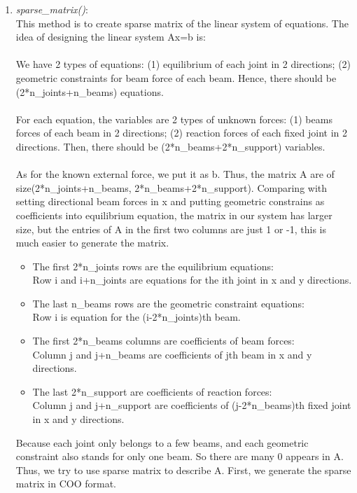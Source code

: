 \documentclass{article}
\begin{document}
\begin{enumerate}
\item \emph{sparse\_matrix()}:\\
This method is to create sparse matrix of the linear system of equations. The idea of designing the linear system Ax=b is: \\\\
We have 2 types of equations: (1) equilibrium of each joint in 2 directions; (2) geometric constraints for beam force of each beam. Hence, there should be (2*n\_joints+n\_beams) equations. \\\\
For each equation, the variables are 2 types of unknown forces: (1) beams forces of each beam in 2 directions; (2) reaction forces of each fixed joint in 2 directions. Then, there should be (2*n\_beams+2*n\_support) variables. \\\\
As for the known external force, we put it as b. Thus, the matrix A are of size(2*n\_joints+n\_beams, 2*n\_beams+2*n\_support). Comparing with setting directional beam forces in x and putting geometric constrains as coefficients into equilibrium equation, the matrix in our system has larger size, but the entries of A in the first two columns are just 1 or -1, this is much easier to generate the matrix.
\begin{itemize}
\item  The first 2*n\_joints rows are the equilibrium equations:\\
Row i and i+n\_joints are equations for the ith joint in x and y directions.
\item The last n\_beams rows are the geometric constraint equations:\\
Row i is equation for the (i-2*n\_joints)th beam.
\item The first 2*n\_beams columns are coefficients of beam forces:\\
Column j and j+n\_beams are coefficients of jth beam in x and y directions.
\item The last 2*n\_support are coefficients of reaction forces:\\
Column j and j+n\_support are coefficients of (j-2*n\_beams)th fixed joint in x and y directions.
\end{itemize}
Because each joint only belongs to a few beams, and each geometric constraint also stands for only one beam. So there are many 0 appears in A. Thus, we try to use sparse matrix to describe A. First, we generate the sparse matrix in COO  format.
\begin{itemize}

\end{itemize}
\end{enumerate}
\end{document}
